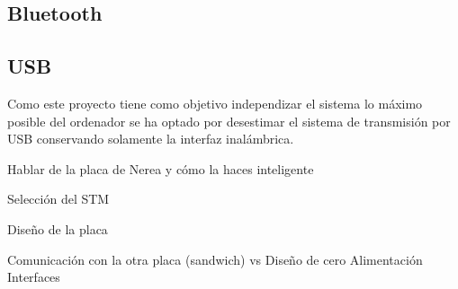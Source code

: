 \subsection{Bluetooth\label{sec:Bluetooth_N}}



\subsection{USB\label{sec:USB_N}}


Como este proyecto tiene como objetivo independizar el sistema lo máximo posible del ordenador se ha optado por desestimar el sistema de transmisión por \acrshort{USB} conservando solamente la interfaz inalámbrica. 

Hablar de la placa de Nerea y cómo la haces inteligente

Selección del STM

Diseño de la placa

	Comunicación con la otra placa (sandwich) vs Diseño de cero
	Alimentación
	Interfaces
